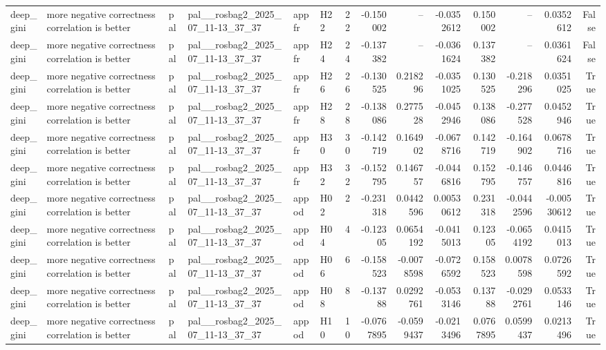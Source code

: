 \begin{longtable}{llllllrrrrrrrr}
deep\_gini & more negative correctness correlation is better & pal & pal\_\_rosbag2\_2025\_07\_11-13\_37\_37 & appfr & H22 & 22 & -0.150002 & -- & -0.0352612 & 0.150002 & -- & 0.0352612 & False \\
deep\_gini & more negative correctness correlation is better & pal & pal\_\_rosbag2\_2025\_07\_11-13\_37\_37 & appfr & H24 & 24 & -0.137382 & -- & -0.0361624 & 0.137382 & -- & 0.0361624 & False \\
deep\_gini & more negative correctness correlation is better & pal & pal\_\_rosbag2\_2025\_07\_11-13\_37\_37 & appfr & H26 & 26 & -0.130525 & 0.218296 & -0.0351025 & 0.130525 & -0.218296 & 0.0351025 & True \\
deep\_gini & more negative correctness correlation is better & pal & pal\_\_rosbag2\_2025\_07\_11-13\_37\_37 & appfr & H28 & 28 & -0.138086 & 0.277528 & -0.0452946 & 0.138086 & -0.277528 & 0.0452946 & True \\
deep\_gini & more negative correctness correlation is better & pal & pal\_\_rosbag2\_2025\_07\_11-13\_37\_37 & appfr & H30 & 30 & -0.142719 & 0.164902 & -0.0678716 & 0.142719 & -0.164902 & 0.0678716 & True \\
deep\_gini & more negative correctness correlation is better & pal & pal\_\_rosbag2\_2025\_07\_11-13\_37\_37 & appfr & H32 & 32 & -0.152795 & 0.146757 & -0.0446816 & 0.152795 & -0.146757 & 0.0446816 & True \\
deep\_gini & more negative correctness correlation is better & pal & pal\_\_rosbag2\_2025\_07\_11-13\_37\_37 & appod & H02 & 2 & -0.231318 & 0.0442596 & 0.00530612 & 0.231318 & -0.0442596 & -0.00530612 & True \\
deep\_gini & more negative correctness correlation is better & pal & pal\_\_rosbag2\_2025\_07\_11-13\_37\_37 & appod & H04 & 4 & -0.12305 & 0.0654192 & -0.0415013 & 0.12305 & -0.0654192 & 0.0415013 & True \\
deep\_gini & more negative correctness correlation is better & pal & pal\_\_rosbag2\_2025\_07\_11-13\_37\_37 & appod & H06 & 6 & -0.158523 & -0.0078598 & -0.0726592 & 0.158523 & 0.0078598 & 0.0726592 & True \\
deep\_gini & more negative correctness correlation is better & pal & pal\_\_rosbag2\_2025\_07\_11-13\_37\_37 & appod & H08 & 8 & -0.13788 & 0.0292761 & -0.0533146 & 0.13788 & -0.0292761 & 0.0533146 & True \\
deep\_gini & more negative correctness correlation is better & pal & pal\_\_rosbag2\_2025\_07\_11-13\_37\_37 & appod & H10 & 10 & -0.0767895 & -0.0599437 & -0.0213496 & 0.0767895 & 0.0599437 & 0.0213496 & True \\

\end{longtable}
